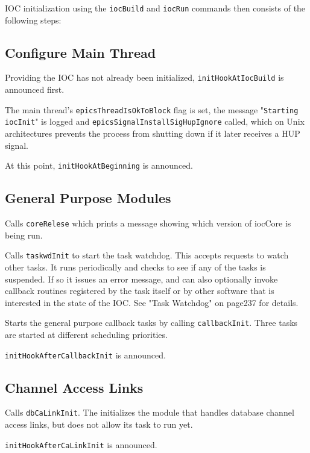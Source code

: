 IOC initialization using the \verb|iocBuild| and \verb|iocRun| commands then consists of the following steps:

\subsection{Configure Main Thread}

Providing the IOC has not already been initialized, \verb|initHookAtIocBuild| is announced first.

The main thread's \verb|epicsThreadIsOkToBlock| flag is set, the message "\verb|Starting iocInit|" is logged and 
\verb|epicsSignalInstallSigHupIgnore| called, which on Unix architectures prevents the process from shutting down 
if it later receives a HUP signal.

At this point, \verb|initHookAtBeginning| is announced.

\subsection{General Purpose Modules}

Calls \verb|coreRelese| which prints a message showing which version of iocCore is being run.

Calls \verb|taskwdInit| to start the task watchdog. This accepts requests to watch other tasks. It runs periodically and checks 
to see if any of the tasks is suspended. If so it issues an error message, and can also optionally invoke callback routines 
registered by the task itself or by other software that is interested in the state of the IOC. See "Task Watchdog" on 
page237 for details.

Starts the general purpose callback tasks by calling \verb|callbackInit|. Three tasks are started at different scheduling 
priorities.

\verb|initHookAfterCallbackInit| is announced.

\subsection{Channel Access Links}

Calls \verb|dbCaLinkInit|. The initializes the module that handles database channel access links, but does not allow its task 
to run yet.

\verb|initHookAfterCaLinkInit| is announced.

